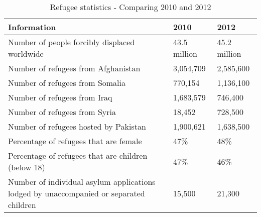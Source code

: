 \begin{center}
\begin{table}[!ht]
\caption{\label{tab:refugeestatistics}Refugee statistics - Comparing 2010 and 2012 \cite{UNHCRstat2010,UNHCRstat2012}}
    \begin{tabular}{ | p{8cm} | l | l |}
    \hline
    \textbf{Information} & \textbf{2010} & \textbf{2012} \\ 
    \hline
    Number of people forcibly displaced worldwide & 43.5 million & 45.2 million  \\ 
    \hline
    
    Number of refugees from Afghanistan & 3,054,709 & 2,585,600 \\ 
    \hline
    Number of refugees from Somalia & 770,154 & 1,136,100 \\ 
    \hline
    Number of refugees from Iraq & 1,683,579 & 746,400 \\ 
    \hline
     Number of refugees from Syria & 18,452 & 728,500 \\ 
    \hline
    Number of refugees hosted by Pakistan & 1,900,621 & 1,638,500 \\
    \hline
    Percentage of refugees that are female & 47\% & 48\% \\
	\hline
	Percentage of refugees that are children (below 18) & 47\% & 46\% \\
	\hline
	Number of individual asylum applications lodged by unaccompanied or separated children & 15,500 & 21,300 \\
	\hline
    \end{tabular}
   \end{table}
\end{center}


